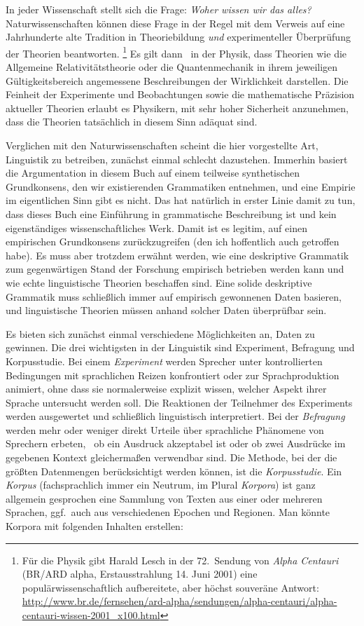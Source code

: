 
In jeder Wissenschaft stellt sich die Frage:
\textit{Woher wissen wir das alles?}
Naturwissenschaften können diese Frage in der Regel mit dem Verweis auf eine Jahrhunderte alte Tradition in Theoriebildung \textit{und} experimenteller Überprüfung der Theorien beantworten.%
\footnote{Für die Physik gibt Harald Lesch in der 72.\ Sendung von \textit{Alpha Centauri} (BR\slash ARD alpha, Erstausstrahlung 14. Juni 2001) eine populärwissenschaftlich aufbereitete, aber höchst souveräne Antwort: \url{http://www.br.de/fernsehen/ard-alpha/sendungen/alpha-centauri/alpha-centauri-wissen-2001_x100.html}}
Es gilt dann \zB\ in der Physik, dass Theorien wie die Allgemeine Relativitätstheorie oder die Quantenmechanik in ihrem jeweiligen Gültigkeitsbereich angemessene Beschreibungen der Wirklichkeit darstellen.
Die Feinheit der Experimente und Beobachtungen sowie die mathematische Präzision aktueller Theorien erlaubt es Physikern, mit sehr hoher Sicherheit anzunehmen, dass die Theorien tatsächlich in diesem Sinn adäquat sind.

Verglichen mit den Naturwissenschaften scheint die hier vorgestellte Art, Linguistik zu betreiben, zunächst einmal schlecht dazustehen.
Immerhin basiert die Argumentation in diesem Buch auf einem teilweise synthetischen Grundkonsens, den wir existierenden Grammatiken entnehmen, und eine Empirie im eigentlichen Sinn gibt es nicht.
Das hat natürlich in erster Linie damit zu tun, dass dieses Buch eine Einführung in grammatische Beschreibung ist und kein eigenständiges wissenschaftliches Werk.
Damit ist es legitim, auf einen empirischen Grundkonsens zurückzugreifen (den ich hoffentlich auch getroffen habe).
Es muss aber trotzdem erwähnt werden, wie eine deskriptive Grammatik zum gegenwärtigen Stand der Forschung empirisch betrieben werden kann und wie echte linguistische Theorien beschaffen sind.
Eine solide deskriptive Grammatik muss schließlich immer auf empirisch gewonnenen Daten basieren, und linguistische Theorien müssen anhand solcher Daten überprüfbar sein. 

Es bieten sich zunächst einmal verschiedene Möglichkeiten an, Daten zu gewinnen.
Die drei wichtigsten in der Linguistik sind Experiment, Befragung und Korpusstudie.
Bei einem \textit{Experiment} werden Sprecher unter kontrollierten Bedingungen mit sprachlichen Reizen konfrontiert oder zur Sprachproduktion animiert, ohne dass sie normalerweise explizit wissen, welcher Aspekt ihrer Sprache untersucht werden soll.
Die Reaktionen der Teilnehmer des Experiments werden ausgewertet und schließlich linguistisch interpretiert.
Bei der \textit{Befragung} werden mehr oder weniger direkt Urteile über sprachliche Phänomene von Sprechern erbeten, \zB\ ob ein Ausdruck akzeptabel ist oder ob zwei Ausdrücke im gegebenen Kontext gleichermaßen verwendbar sind.
Die Methode, bei der die größten Datenmengen berücksichtigt werden können, ist die \textit{Korpusstudie}.
Ein \textit{Korpus} (fachsprachlich immer ein Neutrum, im Plural \textit{Korpora}) ist ganz allgemein gesprochen eine Sammlung von Texten aus einer oder mehreren Sprachen, ggf.\ auch aus verschiedenen Epochen und Regionen.
Man könnte \zB Korpora mit folgenden Inhalten erstellen:

